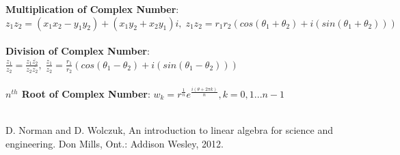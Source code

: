 \documentclass[12pt]{article}
\begin{document}
\begin{appendices}
\noindent
\textbf{Multiplication of Complex Number}: $z_1z_2 =(x_1x_2-y_1y_2) + (x_1y_2+x_2y_1)i, \; z_1z_2 = r_1r_2(cos(\theta_1+\theta_2) + i(sin(\theta_1+\theta_2)))$\\\\
\noindent
\textbf{Division of Complex Number}: $\frac{z_1}{z_2} = \frac{z_1\overline{z_2}}{z_2\overline{z_2}}, \; \frac{z_1}{z_2} = \frac{r_1}{r_2}(cos(\theta_1-\theta_2) + i(sin(\theta_1-\theta_2)))$\\\\
\textbf{$n^{th}$ Root of Complex Number}: $w_k = r^{\frac{1}{n}}e^{\frac{i(\theta+2\pi k)}{n}}, k = 0,1...n-1$\\\\
\noindent

\thispagestyle{empty}
\end{appendices}

\newpage
\begin{thebibliography}{1}
D. Norman and D. Wolczuk, An introduction to linear algebra for science and engineering. Don Mills, Ont.: Addison Wesley, 2012.


\end {thebibliography}


 
\end{document}
